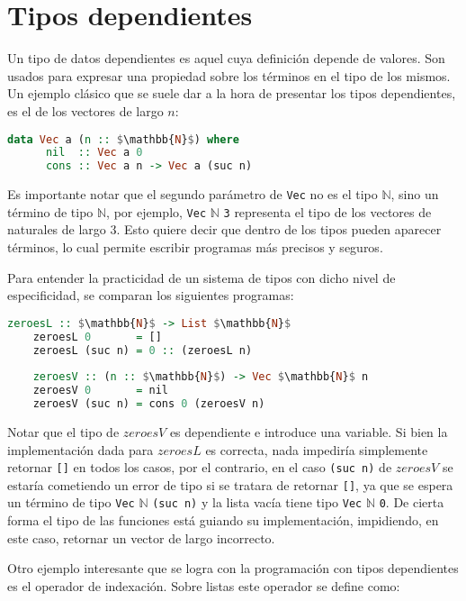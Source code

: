 	
\section{Tipos dependientes}

Un tipo de datos dependientes es aquel cuya definición depende de valores.
Son usados para expresar una propiedad sobre los términos en el tipo de los mismos.
Un ejemplo clásico que se suele dar a la hora de presentar los tipos dependientes, es el de los vectores de largo $n$:

\begin{lstlisting}[mathescape, language=Haskell]
  	data Vec a (n :: $\mathbb{N}$) where
	  nil  :: Vec a 0
	  cons :: Vec a n -> Vec a (suc n)
\end{lstlisting}

Es importante notar que el segundo parámetro de \verb|Vec| no es el tipo $\mathbb{N}$, sino un término de tipo $\mathbb{N}$, por ejemplo, \verb|Vec| $\mathbb{N}$ \verb|3| representa el tipo de los vectores de naturales de largo 3.
Esto quiere decir que dentro de los tipos pueden aparecer términos, lo cual permite escribir programas más precisos y seguros.

Para entender la practicidad de un sistema de tipos con dicho nivel de especificidad, se comparan los siguientes programas:
\begin{lstlisting}[mathescape, language=Haskell]
	zeroesL :: $\mathbb{N}$ -> List $\mathbb{N}$
	zeroesL 0       = []
	zeroesL (suc n) = 0 :: (zeroesL n)
	
	zeroesV :: (n :: $\mathbb{N}$) -> Vec $\mathbb{N}$ n
	zeroesV 0       = nil
	zeroesV (suc n) = cons 0 (zeroesV n)
\end{lstlisting}

Notar que el tipo de $zeroesV$ es dependiente e introduce una variable.
Si bien la implementación dada para $zeroesL$ es correcta, nada impediría simplemente retornar \verb|[]| en todos los casos, por el contrario, en el caso \verb|(suc n)| de $zeroesV$ se estaría cometiendo un error de tipo si se tratara de retornar \verb|[]|, ya que se espera un término de tipo \verb|Vec| $\mathbb{N}$ \verb|(suc n)| y la lista vacía tiene tipo \verb|Vec| $\mathbb{N}$ \verb|0|.
De cierta forma el tipo de las funciones está guiando su implementación, impidiendo, en este caso, retornar un vector de largo incorrecto.

Otro ejemplo interesante que se logra con la programación con tipos dependientes es el operador de indexación. Sobre listas este operador se define como:


